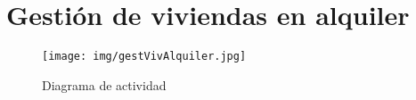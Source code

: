 \pagebreak
\section{Gestión de viviendas en alquiler}
\begin{figure}[!h]
  \centering
    \texttt{[image: img/gestVivAlquiler.jpg]}
    \caption{Diagrama de actividad}
\end{figure}